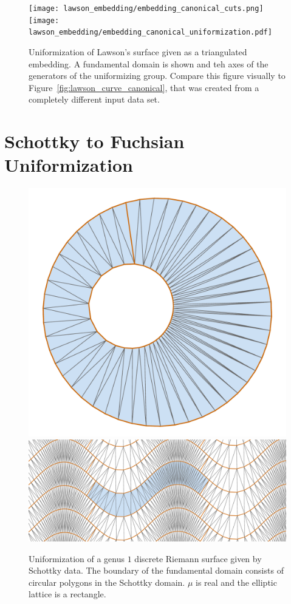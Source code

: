 \documentclass[Thesis.tex]{subfiles}
\begin{document}
\begin{figure}
	\centering
	\texttt{[image: lawson\_embedding/embedding\_canonical\_cuts.png]}
	\texttt{[image: lawson\_embedding/embedding\_canonical\_uniformization.pdf]}
	\caption{Uniformization of Lawson's surface given as a triangulated embedding. A fundamental domain is shown and
teh axes of the generators of the uniformizing group. Compare this figure visually to Figure~\ref{fig:lawson_curve_canonical}, that was created from a 
completely different input data set.}
	\label{fig:lawson_embedding_canonical}
\end{figure}

\section{Schottky to Fuchsian Uniformization}

\begin{figure}
	\centering
	\includegraphics[width=0.28\linewidth]{data/schottky_g1/res50_image}
	\quad
	\includegraphics[width=0.68\linewidth]{data/schottky_g1/res50_cover}
	\caption{Uniformization of a genus $1$ discrete Riemann surface given by Schottky data.
	The boundary of the fundamental domain consists of circular polygons in the Schottky domain. $\mu$ is real and the elliptic lattice is a rectangle.}
	\label{fig:fuchsian_to_schottky_genus1}
\end{figure}
\end{document}
